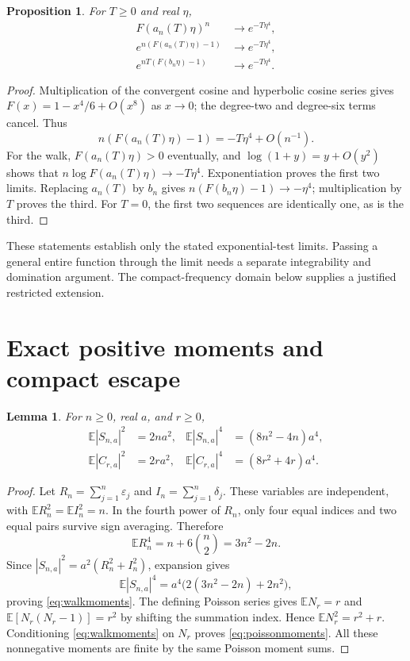 \documentclass[11pt]{article}
\newtheorem{lemma}[theorem]{Lemma}
\newtheorem{proposition}[theorem]{Proposition}
\newcommand{\E}{\mathbb E}\newcommand{\Pp}{\mathbb P}
\begin{document}
\begin{proposition}\label{prop:limit}
For $T\geq0$ and real $\eta$,
\begin{align*}
 F(a_n(T)\eta)^n&\longrightarrow e^{-T\eta^4},\\
 e^{n(F(a_n(T)\eta)-1)}&\longrightarrow e^{-T\eta^4},\\
 e^{nT(F(b_n\eta)-1)}&\longrightarrow e^{-T\eta^4}.
\end{align*}
\end{proposition}
\begin{proof}
Multiplication of the convergent cosine and hyperbolic cosine series
gives $F(x)=1-x^4/6+O(x^8)$ as $x\to0$; the degree-two and degree-six
terms cancel. Thus
\[
 n(F(a_n(T)\eta)-1)=-T\eta^4+O(n^{-1}).
\]
For the walk, $F(a_n(T)\eta)>0$ eventually, and
$\log(1+y)=y+O(y^2)$ shows that
$n\log F(a_n(T)\eta)\to-T\eta^4$. Exponentiation proves the first
two limits. Replacing $a_n(T)$ by $b_n$ gives
$n(F(b_n\eta)-1)\to-\eta^4$; multiplication by $T$ proves the third.
For $T=0$, the first two sequences are identically one, as is the third.
\end{proof}

These statements establish only the stated exponential-test limits.
Passing a general entire function through the limit needs a separate
integrability and domination argument. The compact-frequency domain below supplies a justified restricted extension.

\section{Exact positive moments and compact escape}
\begin{lemma}\label{lem:moments}
For $n\geq0$, real $a$, and $r\geq0$,
\begin{align}
 \E|S_{n,a}|^2&=2na^2,&
 \E|S_{n,a}|^4&=(8n^2-4n)a^4,\label{eq:walkmoments}\\
 \E|C_{r,a}|^2&=2ra^2,&
 \E|C_{r,a}|^4&=(8r^2+4r)a^4.\label{eq:poissonmoments}
\end{align}
\end{lemma}
\begin{proof}
Let $R_n=\sum_{j=1}^n\varepsilon_j$ and
$I_n=\sum_{j=1}^n\delta_j$. These variables are independent, with
$\E R_n^2=\E I_n^2=n$. In the fourth power of $R_n$, only four equal
indices and two equal pairs survive sign averaging. Therefore
\[
 \E R_n^4=n+6\binom n2=3n^2-2n.
\]
Since $|S_{n,a}|^2=a^2(R_n^2+I_n^2)$, expansion gives
\[
 \E|S_{n,a}|^4=a^4\bigl(2(3n^2-2n)+2n^2\bigr),
\]
proving \eqref{eq:walkmoments}. The defining Poisson series gives
$\E N_r=r$ and $\E[N_r(N_r-1)]=r^2$ by shifting the summation index.
Hence $\E N_r^2=r^2+r$. Conditioning \eqref{eq:walkmoments} on
$N_r$ proves \eqref{eq:poissonmoments}. All these nonnegative
moments are finite by the same Poisson moment sums.
\end{proof}
\end{document}
